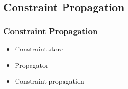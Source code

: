 \documentclass{beamer}
\begin{document}



\subsection{Constraint Propagation}

\begin{frame}
  \frametitle{Constraint Propagation}
  \begin{itemize}
    \item Constraint store
    \item Propagator
    \item Constraint propagation
  \end{itemize}
\end{frame}
\end{document}
